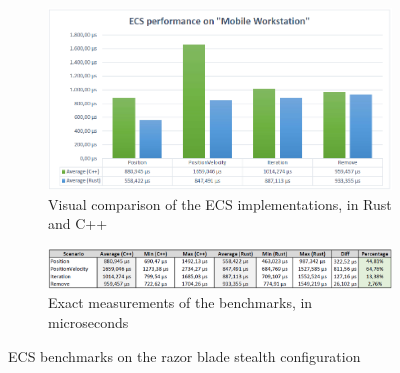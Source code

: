 \clearpage

\begin{figure}[h!]
	\centering
	\begin{subfigure}[b]{\textwidth}
		\includegraphics[width=1\linewidth]{PICs/ecs_bench_workstation.png}
		\caption{Visual comparison of the \ac{ECS} implementations, in Rust and C++}
		\label{fig:ecs_bench_blade} 
	\end{subfigure}
	
	\begin{subfigure}[b]{\textwidth}
		\includegraphics[width=1\linewidth]{PICs/ecs_bench_workstation_data.png}
		\caption{Exact measurements of the benchmarks, in microseconds}
		\label{fig:ecs_bench_blade_data}
	\end{subfigure}
	
	\caption[ECS benchmarks blade]{\ac{ECS} benchmarks on the razor blade stealth configuration}
\end{figure}